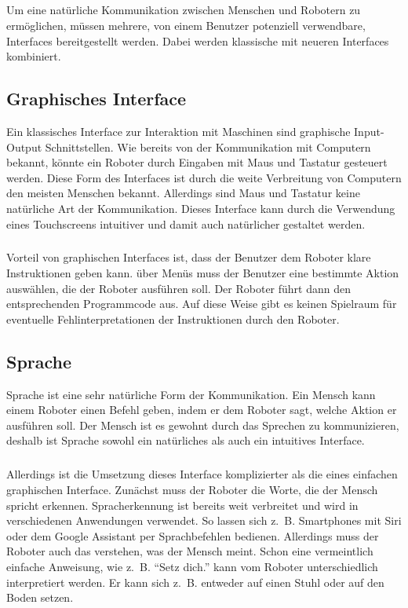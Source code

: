 \subparagraph{}
Um eine natürliche Kommunikation zwischen Menschen und Robotern zu ermöglichen,
müssen mehrere, von einem Benutzer potenziell verwendbare, Interfaces
bereitgestellt werden. Dabei werden klassische mit neueren Interfaces
kombiniert.

\subsection{Graphisches Interface}
Ein klassisches Interface zur Interaktion mit Maschinen sind graphische
Input-Output Schnittstellen. Wie bereits von der Kommunikation mit Computern
bekannt, könnte ein Roboter durch Eingaben mit Maus und Tastatur gesteuert
werden. Diese Form des Interfaces ist durch die weite Verbreitung von Computern
den meisten Menschen bekannt. Allerdings sind Maus und Tastatur keine
natürliche Art der Kommunikation. Dieses Interface kann durch die Verwendung
eines Touchscreens intuitiver und damit auch natürlicher gestaltet werden.

\subparagraph{}
Vorteil von graphischen Interfaces ist, dass der Benutzer dem Roboter klare
Instruktionen geben kann. über Menüs muss der Benutzer eine bestimmte Aktion
auswählen, die der Roboter ausführen soll. Der Roboter führt dann den
entsprechenden Programmcode aus. Auf diese Weise gibt es keinen Spielraum für
eventuelle Fehlinterpretationen der Instruktionen durch den Roboter.

\subsection{Sprache}
Sprache ist eine sehr natürliche Form der Kommunikation. Ein Mensch kann einem
Roboter einen Befehl geben, indem er dem Roboter sagt, welche Aktion er
ausführen soll. Der Mensch ist es gewohnt durch das Sprechen zu kommunizieren,
deshalb ist Sprache sowohl ein natürliches als auch ein intuitives Interface.

\subparagraph{}
Allerdings ist die Umsetzung dieses Interface komplizierter als die eines
einfachen graphischen Interface. Zunächst muss der Roboter die Worte, die der
Mensch spricht erkennen. Spracherkennung ist bereits weit verbreitet und wird in
verschiedenen Anwendungen verwendet. So lassen sich z.~B. Smartphones mit Siri
oder dem Google Assistant per Sprachbefehlen bedienen. Allerdings muss der
Roboter auch das verstehen, was der Mensch meint. Schon eine vermeintlich
einfache Anweisung, wie z.~B. "`Setz dich."' kann vom Roboter unterschiedlich
interpretiert werden. Er kann sich z.~B. entweder auf einen Stuhl oder auf den
Boden setzen.

